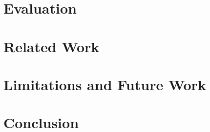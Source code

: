 \documentclass[conference]{IEEEtran}
\begin{document}



\section{Evaluation}\label{sec:eval}




\section{Related Work}\label{sec:related}




\section{Limitations and Future Work}\label{sec:limitations}




\section{Conclusion}\label{sec:conclusion}








\end{document}
